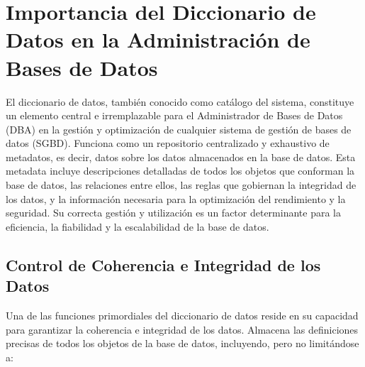 \section{Importancia del Diccionario de Datos en la Administración de Bases de Datos}

El diccionario de datos, también conocido como catálogo del sistema, constituye un elemento central e irremplazable para el Administrador de Bases de Datos (DBA) en la gestión y optimización de cualquier sistema de gestión de bases de datos (SGBD). Funciona como un repositorio centralizado y exhaustivo de metadatos, es decir, datos sobre los datos almacenados en la base de datos. Esta metadata incluye descripciones detalladas de todos los objetos que conforman la base de datos, las relaciones entre ellos, las reglas que gobiernan la integridad de los datos, y la información necesaria para la optimización del rendimiento y la seguridad. Su correcta gestión y utilización es un factor determinante para la eficiencia, la fiabilidad y la escalabilidad de la base de datos.

\subsection{Control de Coherencia e Integridad de los Datos}

Una de las funciones primordiales del diccionario de datos reside en su capacidad para garantizar la coherencia e integridad de los datos. Almacena las definiciones precisas de todos los objetos de la base de datos, incluyendo, pero no limitándose a:

